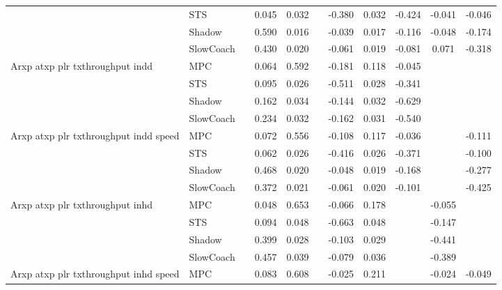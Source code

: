 \begin{tabular}{|l|l|*{9}{c|}}
                              & STS &       &     0.045 &     0.032 &     & -0.380 &  0.032 &  -0.424 &  -0.041 &   -0.046 \\
                              & Shadow &       &     0.590 &     0.016 &     & -0.039 &  0.017 &  -0.116 &  -0.048 &   -0.174 \\
                              & SlowCoach &       &     0.430 &     0.020 &     & -0.061 &  0.019 &  -0.081 &   0.071 &   -0.318 \\
\midrule
Arxp atxp plr txthroughput indd    & MPC &       &     0.064 &     0.592 &     & -0.181 &  0.118 &  -0.045 &      &       \\
                              & STS &       &     0.095 &     0.026 &     & -0.511 &  0.028 &  -0.341 &      &       \\
                              & Shadow &       &     0.162 &     0.034 &     & -0.144 &  0.032 &  -0.629 &      &       \\
                              & SlowCoach &       &     0.234 &     0.032 &     & -0.162 &  0.031 &  -0.540 &      &       \\
\midrule
Arxp atxp plr txthroughput indd speed    & MPC &       &     0.072 &     0.556 &     & -0.108 &  0.117 &  -0.036 &      &   -0.111 \\
                              & STS &       &     0.062 &     0.026 &     & -0.416 &  0.026 &  -0.371 &      &   -0.100 \\
                              & Shadow &       &     0.468 &     0.020 &     & -0.048 &  0.019 &  -0.168 &      &   -0.277 \\
                              & SlowCoach &       &     0.372 &     0.021 &     & -0.061 &  0.020 &  -0.101 &      &   -0.425 \\
\midrule
Arxp atxp plr txthroughput inhd    & MPC &       &     0.048 &     0.653 &     & -0.066 &  0.178 &      &  -0.055 &       \\
                              & STS &       &     0.094 &     0.048 &     & -0.663 &  0.048 &      &  -0.147 &       \\
                              & Shadow &       &     0.399 &     0.028 &     & -0.103 &  0.029 &      &  -0.441 &       \\
                              & SlowCoach &       &     0.457 &     0.039 &     & -0.079 &  0.036 &      &  -0.389 &       \\
\midrule
Arxp atxp plr txthroughput inhd speed    & MPC &       &     0.083 &     0.608 &     & -0.025 &  0.211 &      &  -0.024 &   -0.049 \\

\end{tabular}
